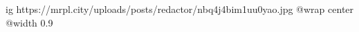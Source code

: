  
 
 
 
 

\ifcmt
  ig https://mrpl.city/uploads/posts/redactor/nbq4j4bim1uu0yao.jpg
  @wrap center
  @width 0.9
\fi
